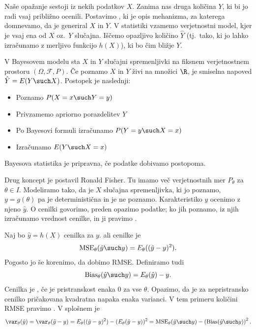 
Naše opažanje sestoji iz nekih podatkov $X$.
Zanima nas druga količina $Y$, ki bi jo radi vsaj približno ocenili.
Postavimo , ki je opis mehanizma, za katerega
domnevamo, da je generiral $X$ in $Y$.
V statistiki vzamemo verjetnostni model, kjer je vsaj ena od $X$ oz.~$Y$
slučajna.
Iščemo opazljivo količino $\hat{Y}$ (tj.~tako, ki jo lahko izračunamo z merljivo
funkcijo $h(X)$), ki bo čim bližje $Y$.

V Bayesovem modelu sta $X$ in $Y$ slučajni spremenljivki na fiksnem
verjetnostnem prostoru $(\Omega, \mathcal{F}, P)$.
Če poznamo $X$ in $Y$ živi na množici $\R$, je smiselna napoved $\hat{Y} = E(Y
\such X)$.
Postopek je naslednji:
\begin{itemize}
\item Poznamo $P(X = x \such Y = y)$
\item Privzamemo apriorno porazdelitev $Y$
\item Po Bayesovi formuli izračunamo $P(Y = y \such X = x)$
\item Izračunamo $E(Y \such X = x)$
\end{itemize}
Bayesova statistika je pripravna, če podatke dobivamo postopoma.

Drug koncept je postavil Ronald Fisher.
Tu imamo več verjetnostnih mer $P_\theta$ za $\theta \in I$.
Modeliramo tako, da je $X$ slučajna spremenljivka, ki jo poznamo, $y =
g(\theta)$ pa je deterministična in je ne poznamo.
Karakteristiko $y$ ocenimo z njeno  $\hat{y}$.
O cenilki govorimo, preden opazimo podatke; ko jih poznamo, iz njih izračunamo
vrednost cenilke, in ji pravimo .



Naj bo $\hat{y} = h(X)$ cenilka za $y$.
 ali  cenilke je
\[
  \operatorname{MSE}_\theta(\hat{y} \such y) = E_\theta((\hat{y} - y)^2).
\]
Pogosto jo še korenimo, da dobimo RMSE.
Definiramo tudi 
\[
  \operatorname{Bias}_\theta(\hat{y} \such y)
  = E_\theta(\hat{y}) - y.
\]
Cenilka je , če je pristranskost enaka $0$ za vse $\theta$.
Opazimo, da je za nepristransko cenilko pričakovana kvadratna napaka enaka
varianci.
V tem primeru količini RMSE pravimo .
V splošnem je
\[
  \var_\theta(\hat{y})
  = \var_\theta(\hat{y} - y)
  = E_\theta((\hat{y} - y)^2) - (E_\theta(\hat{y} - y))^2
  = \operatorname{MSE}_\theta(\hat{y} \such y)
  - \left( \operatorname{Bias}(\hat{y} \such y) \right)^2.
\]

